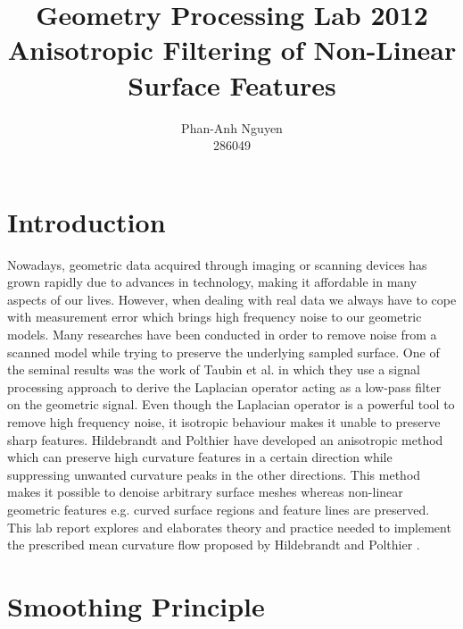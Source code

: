 \documentclass[11pt]{article}
\author{Phan-Anh Nguyen\\
		286049}
\title{Geometry Processing Lab 2012\\
	   Anisotropic Filtering of Non-Linear Surface Features}
\begin{document}
\maketitle



\section{Introduction}

Nowadays, geometric data acquired through imaging or scanning devices has grown rapidly due to advances in technology, making it affordable in many aspects of our lives. However, when dealing with real data we always have to cope with measurement error which brings high frequency noise to our geometric models. Many researches have been conducted in order to remove noise from a scanned model while trying to preserve the underlying sampled surface. One of the seminal results was the work of Taubin et al. \cite{Taubin:1995:SPA:218380.218473} in which they use a signal processing approach to derive the Laplacian operator acting as a low-pass filter on the geometric signal. Even though the Laplacian operator is a powerful tool to remove high frequency noise, it isotropic behaviour makes it unable to preserve sharp features. Hildebrandt and Polthier \cite{Hildebrandt04anisotropicfiltering} have developed an anisotropic method which can preserve high curvature features in a certain direction while suppressing unwanted curvature peaks in the other directions. This method makes it possible to denoise arbitrary surface meshes whereas non-linear geometric features e.g. curved surface regions and feature lines are preserved. This lab report explores and elaborates theory and practice needed to implement the prescribed mean curvature flow proposed by Hildebrandt and Polthier \cite{Hildebrandt04anisotropicfiltering}.

\section{Smoothing Principle}
\end{document}
